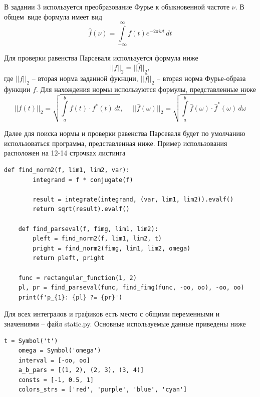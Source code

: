 \documentclass[a4paper, 16pt]{article}
\begin{document}
    \noindent В задании 3 используется преобразование Фурье к обыкновенной частоте $\nu$. В общем\
    виде формула имеет вид
    $$
    \hat{f}\left(\nu\right)=\int\limits_{-\infty}^{\infty}f\left(t\right)e^{-2\pi i \nu t}\,dt
    $$


    \noindent Для проверки равенства Парсеваля используется формула ниже
    $$
    \left|\left|f\right|\right|_2=||\hat{f}||_2,
    $$
    \noindent где $||f||_2$ -- вторая норма заданной фукнции, $||\hat{f}||_2$ -- вторая норма
    Фурье-образа функции $f$. Для нахождения нормы используются формулы, представленные ниже
    $$
    ||f(t)||_2=\sqrt{\int\limits_{a}^{b}f(t)\cdot f^{*}(t)\,dt},\,\,\,\,\,\,\,\,||\hat{f}(\omega)||_2=\sqrt{\int\limits_{a}^{b}\hat{f}(\omega)\cdot \hat{f}^{*}(\omega)\,d\omega}
    $$


    \noindent Далее для поиска нормы и проверки равенства Парсеваля будет по умолчанию использоваться
    программа, представленная ниже. Пример использования расположен на 12-14 строчках листинга
    \begin{lstlisting}[label=pars_show, caption=Программа для вычисления нормы и левой и правой стороны равенства Парсевался]
    def find_norm2(f, lim1, lim2, var):
        integrand = f * conjugate(f)

        result = integrate(integrand, (var, lim1, lim2)).evalf()
        return sqrt(result).evalf()

    def find_parseval(f, fimg, lim1, lim2):
        pleft = find_norm2(f, lim1, lim2, t)
        pright = find_norm2(fimg, lim1, lim2, omega)
        return pleft, pright

    func = rectangular_function(1, 2)
    pl, pr = find_parseval(func, find_fimg(func, -oo, oo), -oo, oo)
    print(f'p_{1}: {pl} ?= {pr}')
    \end{lstlisting}


    \noindent Для всех интегралов и графиков есть место с общими переменными и значениями -- файл static.py. Основные используемые
    данные приведены ниже
    \begin{lstlisting}[label=static, caption=Основные данные из файла static.py]
    t = Symbol('t')
    omega = Symbol('omega')
    interval = [-oo, oo]
    a_b_pars = [(1, 2), (2, 3), (3, 4)]
    consts = [-1, 0.5, 1]
    colors_strs = ['red', 'purple', 'blue', 'cyan'] 
    \end{lstlisting}
\end{document}
